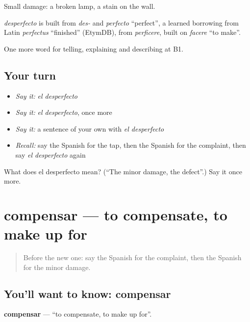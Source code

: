 Small damage: a broken lamp, a stain on the wall.

\begin{cousinweb}
\emph{desperfecto} is built from \emph{des-} and \emph{perfecto} \textquotedblleft{}perfect\textquotedblright{}, a learned borrowing from Latin \emph{perfectus} \textquotedblleft{}finished\textquotedblright{} (EtymDB), from \emph{perficere}, built on \emph{facere} \textquotedblleft{}to make\textquotedblright{}.
\end{cousinweb}

\begin{grammarlens}[title={What you've built}]
One more word for telling, explaining and describing at B1.
\end{grammarlens}

\subsection*{Your turn}
\begin{itemize}
\raggedright
  \item \emph{Say it:} \emph{el desperfecto}
  \item \emph{Say it:} \emph{el desperfecto}, once more
  \item \emph{Say it:} a sentence of your own with \emph{el desperfecto}
  \item \emph{Recall:} say the Spanish for the tap, then the Spanish for the complaint, then say \emph{el desperfecto} again
\end{itemize}

\begin{tcolorbox}[breakable,colback=teal!4,colframe=teal!35!black,title={Before you move on}]
What does el desperfecto mean? (\textquotedblleft{}The minor damage, the defect\textquotedblright{}.) Say it once more.
\end{tcolorbox}
\section[compensar]{compensar — to compensate, to make up for}

\label{lesson:ES-C665-compensar}



\begin{quote}
Before the new one: say the Spanish for the complaint, then the Spanish for the minor damage.
\end{quote}

\subsection*{You'll want to know: compensar}
\textbf{compensar} — \textquotedblleft{}to compensate, to make up for\textquotedblright{}.

